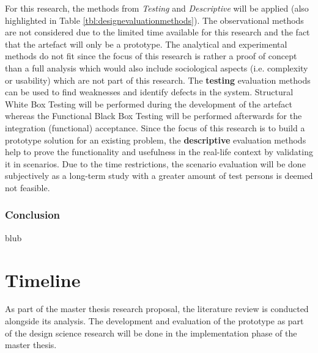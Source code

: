 For this research, the methods from \textit{Testing} and \textit{Descriptive} will be applied (also highlighted in Table \ref{tbl:designevaluationmethods}). \newline
The observational methods are not considered due to the limited time available for this research and the fact that the artefact will only be a prototype. The analytical and experimental methods do not fit since the focus of this research is rather a proof of concept than a full analysis which would also include sociological aspects (i.e. complexity or usability) which are not part of this research.\newline
The \textbf{testing} evaluation methods can be used to find weaknesses and identify defects in the system. Structural White Box Testing will be performed during the development of the artefact whereas the Functional Black Box Testing will be performed afterwards for the integration (functional) acceptance. \newline
Since the focus of this research is to build a prototype solution for an existing problem, the \textbf{descriptive} evaluation methods help to prove the functionality and usefulness in the real-life context by validating it in scenarios. Due to the time restrictions, the scenario evaluation will be done subjectively as a long-term study with a greater amount of test persons is deemed not feasible.



\subsubsection{Conclusion}

blub



\section{Timeline}

As part of the master thesis research proposal, the literature review is conducted alongside its analysis. The development and evaluation of the prototype as part of the design science research will be done in the implementation phase of the master thesis.


